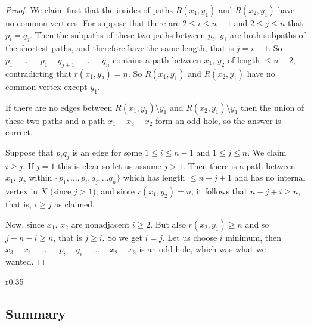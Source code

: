 \begin{proof}
	We claim first that the insides of paths $R(x_1, y_1)$ and $R(x_2, y_1)$ have no common vertices. For suppose that there are $2 \leq i \leq n-1$ and $2 \leq j \leq n$ that $p_i = q_j$. Then the subpaths of these two paths between $p_i$, $y_1$ are both subpaths of the shortest paths, and therefore have the same length, that is $j=i+1$. So $p_1-\ldots-p_1-q_{j+1}-\ldots-q_n$ contains a path between $x_1$, $y_2$ of length $\leq n-2$, contradicting that $r(x_1, y_2) = n$. So $R(x_1, y_1)$ and $R(x_2, y_1)$ have no common vertex except $y_1$.

	If there are no edges between $R(x_1, y_1) \setminus y_1$ and $R(x_2, y_1) \setminus y_1$ then the union of these two paths and a path $x_1-x_3-x_2$ form an odd hole, so the answer is correct.

	Suppose that $p_iq_j$ is an edge for some $1\leq i \leq n-1$ and $1 \leq j \leq n$. We claim $i \geq j$. If $j = 1$ this is clear so let us assume $j > 1$. Then there is a path between $x_1$, $y_2$ within $\{p_1, \ldots , p_i, q_j, \ldots q_n\}$ which has length $\leq n-j+1$ and has no internal vertex in $X$ (since $j > 1$); and since $r(x_1, y_2) = n$, it follows that $n-j+i \geq n$, that is, $i \geq j$ as claimed.

	Now, since $x_1$, $x_2$ are nonadjacent $i \geq 2$. But also $r(x_2, y_1) \geq n$ and so $j+n-i \geq n$, that is $j \geq i$. So we get $i=j$. Let us choose $i$ minimum, then $x_3-x_1-\ldots-p_i-q_i-\ldots-x_2-x_3$ is an odd hole, which was what we wanted.
\end{proof}

\begin{wrapfigure}{r}{0.35\textwidth}
	
\end{wrapfigure}


\subsection{Summary}

